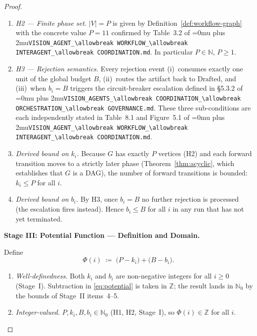 \documentclass[12pt]{article}
\theoremstyle{definition}
\DeclareRobustCommand{\code}[1]{\begingroup\Urlmuskip=0mu plus 2mu\relax\nolinkurl{#1}\endgroup}
\newcommand{\VisionGov}{\code{VISION\_AGENTS\_\allowbreak COORDINATION\_\allowbreak ORCHESTRATION\_\allowbreak GOVERNANCE.md}}
\newcommand{\VisionFlow}{\code{VISION\_AGENT\_\allowbreak WORKFLOW\_\allowbreak INTERAGENT\_\allowbreak COORDINATION.md}}
\begin{document}
\begin{proof}
\begin{enumerate}
  \item \emph{H2 — Finite phase set.}  $|V| = P$ is given by
        Definition~\ref{def:workflow-graph} with the concrete value
        $P = 11$ confirmed by Table~3.2 of
        \VisionFlow{}.
        In particular $P \in \mathbb{N}$, $P \geq 1$.

  \item \emph{H3 — Rejection semantics.}  Every rejection event
        (i)~consumes exactly one unit of the global budget $B$,
        (ii)~routes the artifact back to $\mathrm{Drafted}$, and
        (iii)~when $b_i = B$ triggers the circuit-breaker escalation
        defined in \S5.3.2 of
        \VisionGov{}.  These three sub-conditions are each
        independently stated in Table~8.1 and Figure~5.1 of
        \VisionFlow{}.

  \item \emph{Derived bound on $k_i$.}  Because $G$ has exactly $P$
        vertices (H2) and each forward transition moves to a
        strictly later phase (Theorem~\ref{thm:acyclic}, which establishes
        that $G$ is a DAG), the number of forward transitions is
        bounded: $k_i \leq P$ for all $i$.

  \item \emph{Derived bound on $b_i$.}  By H3, once $b_i = B$ no
        further rejection is processed (the escalation fires
        instead).  Hence $b_i \leq B$ for all $i$ in any run that
        has not yet terminated.
\end{enumerate}

\medskip
\noindent\textbf{Stage III: Potential Function — Definition and Domain.}

Define
\begin{equation}
\label{eq:potential}
\Phi(i) \;\coloneqq\; \bigl(P - k_i\bigr) + \bigl(B - b_i\bigr).
\end{equation}

\begin{enumerate}
  \item \emph{Well-definedness.}  Both $k_i$ and $b_i$ are
        non-negative integers for all $i \geq 0$ (Stage~I).
        Subtraction in \eqref{eq:potential} is taken in $\mathbb{Z}$;
        the result lands in $\mathbb{N}_0$ by the bounds of Stage~II
        items~4--5.

  \item \emph{Integer-valued.}  $P, k_i, B, b_i \in \mathbb{N}_0$
        (H1, H2, Stage~I), so $\Phi(i) \in \mathbb{Z}$ for all $i$.


\end{enumerate}
\end{proof}
\end{document}
